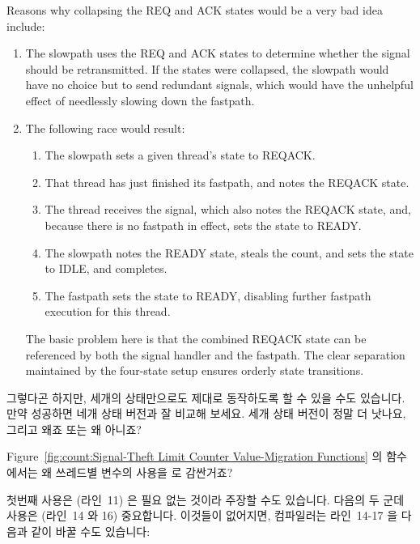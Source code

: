 \begin{enumerate}
	Reasons why collapsing the REQ and ACK states would be a very
	bad idea include:
	\begin{enumerate}
	\item	The slowpath uses the REQ and ACK states to determine
		whether the signal should be retransmitted.
		If the states were collapsed, the slowpath would have
		no choice but to send redundant signals, which would
		have the unhelpful effect of needlessly slowing down
		the fastpath.
	\item	The following race would result:
		\begin{enumerate}
		\item	The slowpath sets a given thread's state to REQACK.
		\item	That thread has just finished its fastpath, and
			notes the REQACK state.
		\item	The thread receives the signal, which also notes
			the REQACK state, and, because there is no fastpath
			in effect, sets the state to READY.
		\item	The slowpath notes the READY state, steals the
			count, and sets the state to IDLE, and completes.
		\item	The fastpath sets the state to READY, disabling
			further fastpath execution for this thread.
		\end{enumerate}
		The basic problem here is that the combined REQACK state
		can be referenced by both the signal handler and the
		fastpath.
		The clear separation maintained by the four-state
		setup ensures orderly state transitions.
	\end{enumerate}
	\fi
	그렇다곤 하지만, 세개의 상태만으로도 제대로 동작하도록 할 수 있을 수도
	있습니다.
	만약 성공하면 네개 상태 버전과 잘 비교해 보세요.
	세개 상태 버전이 정말 더 낫나요, 그리고 왜죠 또는 왜 아니죠?

\QuickQ{}
	Figure~\ref{fig:count:Signal-Theft Limit Counter Value-Migration
	Functions} 의  함수에서는 왜 
	쓰레드별 변수의 사용을  로 감싼거죠?

\QuickA{}
	첫번째  사용은 (라인~11) 은 필요 없는 것이라 주장할
	수도 있습니다.
	다음의 두 군데 사용은 (라인~14 와 16) 중요합니다.
	이것들이 없어지면, 컴파일러는 라인~14-17 을 다음과 같이 바꿀 수도
	있습니다:
	\iffalse


\end{enumerate}
